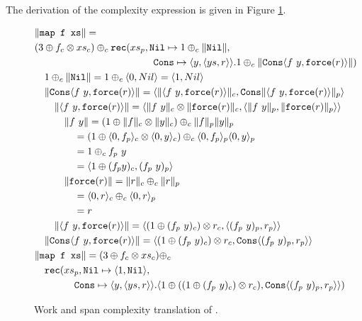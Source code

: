 The derivation of the complexity expression is given in Figure \ref{fig:ws_map_complexity_translation}.
\begin{figure}
  \label{fig:ws_map_complexity_translation}
  \caption{Work and span complexity translation of .}
  \[\begin{split}
    &\|\texttt{map f xs}\| = \\
    &  (3 \oplus f_c \otimes xs_c) \oplus_c \texttt{rec}(xs_p, \texttt{Nil}\mapsto 1 \oplus_c \|\texttt{Nil}\|, \\
    &\qquad\quad\quad\quad\qquad\quad\quad\quad\qquad \texttt{Cons} \mapsto \langle y, \langle ys, r \rangle \rangle. 1 \oplus_c \|\texttt{Cons}\langle f\ y, \texttt{force}(r)\rangle \|) \\
    &\quad 1 \oplus_c \|\texttt{Nil}\| = 1 \oplus_c \langle 0, Nil \rangle = \langle 1, Nil \rangle \\
    &\quad\|\texttt{Cons}\langle f\ y, \texttt{force}(r)\rangle \| = \langle \|\langle f\ y, \texttt{force}(r)\rangle\|_c, \texttt{Cons} \| \langle f\ y, \texttt{force}(r)\rangle \|_p\rangle \\
    &\qquad \|\langle f\ y, \texttt{force}(r)\rangle\| = \langle \|f\ y\|_c \otimes \|\texttt{force}(r)\|_c, \langle \|f\ y\|_p, \|\texttt{force}(r)\|_p\rangle\rangle \\
    &\qquad\quad \|f\ y\| = (1 \oplus \|f\|_c \otimes \|y\|_c) \oplus_c \|f\|_p \|y\|_p \\
    &\qquad\quad\quad = (1 \oplus \langle 0, f_p \rangle_c \otimes \langle 0, y \rangle_c) \oplus_c \langle 0, f_p \rangle_p \langle 0, y \rangle_p \\
    &\qquad\quad\quad = 1 \oplus_c f_p\ y \\
    &\qquad\quad\quad = \langle 1 \oplus (f_p y)_c, (f_p\ y)_p \rangle \\
    &\qquad\quad \|\texttt{force}(r)\| = \|r\|_c \oplus_c \|r\|_p \\
    &\qquad\quad\quad = \langle 0, r \rangle_c \oplus_c \langle 0, r \rangle_p \\
    &\qquad\quad\quad = r \\
    &\qquad \|\langle f\ y, \texttt{force}(r)\rangle\| = \langle (1 \oplus (f_p\ y)_c) \otimes r_c, \langle (f_p\ y)_p, r_p \rangle \rangle \\
    &\quad\|\texttt{Cons}\langle f\ y, \texttt{force}(r)\rangle \| = \langle (1 \oplus (f_p\ y)_c) \otimes r_c, \texttt{Cons} \langle (f_p\ y)_p, r_p \rangle \rangle \\
    &\|\texttt{map f xs}\| = (3 \oplus f_c \otimes xs_c) \oplus_c \\
    &\quad \texttt{rec}(xs_p, \texttt{Nil}\mapsto \langle 1, \texttt{Nil}\rangle, \\
    &\qquad\quad\quad \texttt{Cons} \mapsto \langle y, \langle ys, r \rangle \rangle. \langle 1 \oplus ((1 \oplus (f_p\ y)_c) \otimes r_c), \texttt{Cons} \langle (f_p\ y)_p, r_p \rangle \rangle)
  \end{split}\]
\end{figure}


